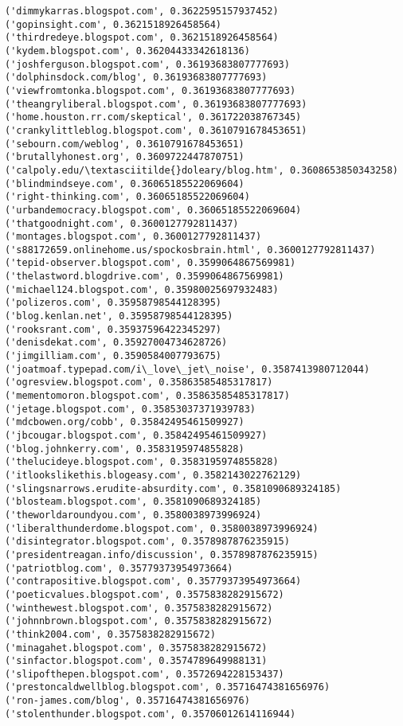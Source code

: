 \documentclass[11pt]{article}
\begin{document}
\begin{Verbatim}[commandchars=\\\{\}]
('dimmykarras.blogspot.com', 0.3622595157937452)
('gopinsight.com', 0.3621518926458564)
('thirdredeye.blogspot.com', 0.3621518926458564)
('kydem.blogspot.com', 0.36204433342618136)
('joshferguson.blogspot.com', 0.36193683807777693)
('dolphinsdock.com/blog', 0.36193683807777693)
('viewfromtonka.blogspot.com', 0.36193683807777693)
('theangryliberal.blogspot.com', 0.36193683807777693)
('home.houston.rr.com/skeptical', 0.361722038767345)
('crankylittleblog.blogspot.com', 0.3610791678453651)
('sebourn.com/weblog', 0.3610791678453651)
('brutallyhonest.org', 0.3609722447870751)
('calpoly.edu/\textasciitilde{}doleary/blog.htm', 0.3608653850343258)
('blindmindseye.com', 0.36065185522069604)
('right-thinking.com', 0.36065185522069604)
('urbandemocracy.blogspot.com', 0.36065185522069604)
('thatgoodnight.com', 0.3600127792811437)
('montages.blogspot.com', 0.3600127792811437)
('s88172659.onlinehome.us/spockosbrain.html', 0.3600127792811437)
('tepid-observer.blogspot.com', 0.3599064867569981)
('thelastword.blogdrive.com', 0.3599064867569981)
('michael124.blogspot.com', 0.35980025697932483)
('polizeros.com', 0.35958798544128395)
('blog.kenlan.net', 0.35958798544128395)
('rooksrant.com', 0.35937596422345297)
('denisdekat.com', 0.35927004734628726)
('jimgilliam.com', 0.3590584007793675)
('joatmoaf.typepad.com/i\_love\_jet\_noise', 0.3587413980712044)
('ogresview.blogspot.com', 0.35863585485317817)
('mementomoron.blogspot.com', 0.35863585485317817)
('jetage.blogspot.com', 0.35853037371939783)
('mdcbowen.org/cobb', 0.35842495461509927)
('jbcougar.blogspot.com', 0.35842495461509927)
('blog.johnkerry.com', 0.3583195974855828)
('thelucideye.blogspot.com', 0.3583195974855828)
('itlookslikethis.blogeasy.com', 0.3582143022762129)
('slingsnarrows.erudite-absurdity.com', 0.3581090689324185)
('blosteam.blogspot.com', 0.3581090689324185)
('theworldaroundyou.com', 0.3580038973996924)
('liberalthunderdome.blogspot.com', 0.3580038973996924)
('disintegrator.blogspot.com', 0.3578987876235915)
('presidentreagan.info/discussion', 0.3578987876235915)
('patriotblog.com', 0.35779373954973664)
('contrapositive.blogspot.com', 0.35779373954973664)
('poeticvalues.blogspot.com', 0.3575838282915672)
('winthewest.blogspot.com', 0.3575838282915672)
('johnnbrown.blogspot.com', 0.3575838282915672)
('think2004.com', 0.3575838282915672)
('minagahet.blogspot.com', 0.3575838282915672)
('sinfactor.blogspot.com', 0.3574789649988131)
('slipofthepen.blogspot.com', 0.3572694228153437)
('prestoncaldwellblog.blogspot.com', 0.35716474381656976)
('ron-james.com/blog', 0.35716474381656976)
('stolenthunder.blogspot.com', 0.35706012614116944)

\end{Verbatim}
\end{document}
